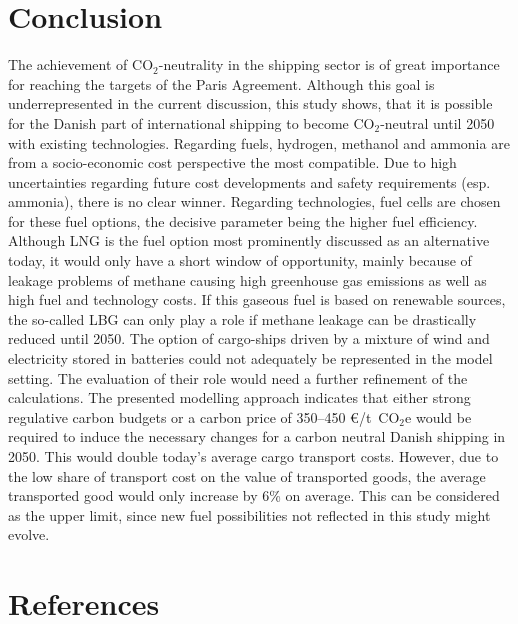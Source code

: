\documentclass[article]{elsarticle}
\begin{document}

\section{Conclusion}
\label{sec:Conclusion}
The achievement of CO$_2$-neutrality in the shipping sector is of great importance for reaching the targets of the Paris Agreement. Although this goal is underrepresented in the current discussion, this study shows, that it is possible for the Danish part of international shipping to become CO$_2$-neutral until 2050 with existing technologies. Regarding fuels, hydrogen, methanol and ammonia are from a socio-economic cost perspective the most compatible. Due to high uncertainties regarding future cost developments and safety requirements (esp. ammonia), there is no clear winner. Regarding technologies, fuel cells are chosen for these fuel options, the decisive parameter being the higher fuel efficiency. Although LNG is the fuel option most prominently discussed as an alternative today, it would only have a short window of opportunity, mainly because of leakage problems of methane causing high greenhouse gas emissions as well as high fuel and technology costs. If this gaseous fuel is based on renewable sources, the so-called LBG can only play a role if methane leakage can be drastically reduced until 2050. The option of cargo-ships driven by a mixture of wind and electricity stored in batteries could not adequately be represented in the model setting. The evaluation of their role would need a further refinement of the calculations.
The presented modelling approach indicates that either strong regulative carbon budgets or a carbon price of 350--450 \euro/t~CO$_2$e would be required to induce the necessary changes for a carbon neutral Danish shipping in 2050. This would double today's average cargo transport costs. However, due to the low share of transport cost on the value of transported goods, the average transported good would only increase by 6\% on average. This can be considered as the upper limit, since new fuel possibilities not reflected in this study might evolve.

\section*{References}


\end{document}
